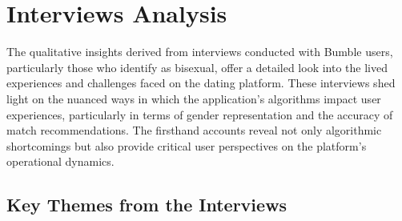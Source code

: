 \section{Interviews Analysis}
The qualitative insights derived from interviews conducted with Bumble users, particularly those who identify as bisexual, offer a detailed look into the lived experiences and challenges faced on the dating platform. These interviews shed light on the nuanced ways in which the application’s algorithms impact user experiences, particularly in terms of gender representation and the accuracy of match recommendations. The firsthand accounts reveal not only algorithmic shortcomings but also provide critical user perspectives on the platform's operational dynamics.

\subsection{Key Themes from the Interviews}
